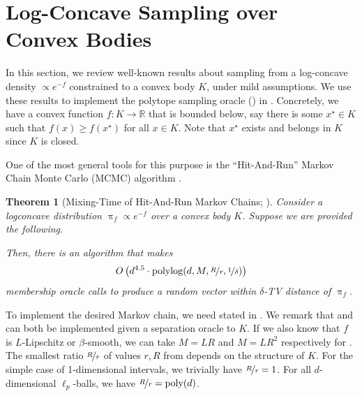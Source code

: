\documentclass[11pt,letterpaper]{article}
\newcommand{\sset}{\subseteq}
\theoremstyle{plain}
\newtheorem{theorem}{Theorem}[section]
\theoremstyle{definition}
\theoremstyle{remark}
\newcommand{\R}{\mathbb{R}}
\newcommand{\nfrac}[2]{\nicefrac{#1}{#2}}
\newcommand{\poly}{\mathrm{poly}}
\newcommand{\polylog}{\mathrm{polylog}}
\renewcommand{\pi}{\uppi}
\begin{document}
{{{    
    
\section{Log-Concave Sampling over Convex Bodies}\label{apx:sampling-polytopes}


In this section, we review well-known results about sampling from a log-concave density $\propto e^{-f}$ constrained to a convex body $K$, under mild assumptions. 
We use these results to implement the polytope sampling oracle () in .
{Concretely,} we have a convex function $f: K\to \R$ that is bounded below, say there is some $x^\star\in K$ such that {$f(x) \geq f(x^\star)$} for all $x\in K$.
{Note that $x^\star$ exists and belongs in $K$ since $K$ is closed.}






    One of the most general tools for this purpose is the ``Hit-And-Run'' Markov Chain Monte Carlo (MCMC) algorithm \cite{lovasz2006fast}.
    \begin{theorem}[Mixing-Time of Hit-And-Run Markov Chains; \cite{lovasz2006simulated,lovasz2006fast}]\label{thm:convex body logconcave sampling}
        Consider a logconcave distribution $\pi_f\propto e^{-f}$ over a convex body $K$.
        Suppose we are provided the following.
        Then, there is an algorithm that makes
        \[
            O\left( d^{4.5}\cdot \polylog(d, M, \nicefrac{R}r, \nicefrac1\delta) \right)
        \]
        membership oracle calls to produce a random vector within $\delta$-TV distance of $\pi_f$.
    \end{theorem}
    To implement the desired Markov chain,
    we need  stated in .
    We remark that  and 
    can both be implemented given a separation oracle to $K$.
    If we also know that $f$ is $L$-Lipschitz or $\beta$-smooth,
    we can take $M = LR$ and $M=LR^2$ respectively for .
    The smallest ratio $\nfrac{R}r$ of values $r, R$ from  depends on the structure of $K$.
    For the simple case of 1-dimensional intervals,
    we trivially have $\nfrac{R}r = 1$.
    For all $d$-dimensional $\ell_p$-balls,
    we have $\nfrac{R}r = \poly(d)$.

}}}
\end{document}
